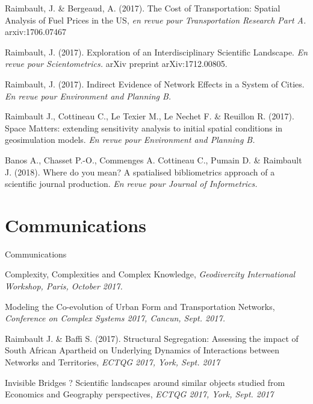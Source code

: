 \noindent Raimbault, J. \& Bergeaud, A. (2017). The Cost of Transportation: Spatial Analysis of Fuel Prices in the US, \textit{en revue pour Transportation Research Part A.} arxiv:1706.07467


\bigskip

\noindent Raimbault, J. (2017). Exploration of an Interdisciplinary Scientific Landscape. \textit{En revue pour Scientometrics.} arXiv preprint arXiv:1712.00805.

\bigskip

\noindent Raimbault, J. (2017). Indirect Evidence of Network Effects in a System of Cities. \textit{En revue pour Environment and Planning B.}

\bigskip

\noindent Raimbault J., Cottineau C., Le Texier M., Le Nechet F. \& Reuillon R.
 (2017). Space Matters: extending sensitivity analysis to initial spatial conditions in geosimulation models. \textit{En revue pour Environment and Planning B.}


\bigskip

\noindent Banos A., Chasset P.-O., Commenges A. Cottineau C., Pumain D. \& Raimbault J. (2018). Where do you mean? A spatialised bibliometrics approach of a scientific journal production. \textit{En revue pour Journal of Informetrics.}





\section*{Communications}{Communications}




\noindent Complexity, Complexities and Complex Knowledge, \textit{Geodivercity International Workshop, Paris, October 2017.}


\bigskip


\noindent Modeling the Co-evolution of Urban Form and Transportation Networks, \textit{Conference on Complex Systems 2017, Cancun, Sept. 2017.}

\bigskip

\noindent Raimbault J. \& Baffi S. (2017). Structural Segregation: Assessing the impact of South African Apartheid on Underlying Dynamics of Interactions between Networks and Territories, \textit{ECTQG 2017, York, Sept. 2017}


\bigskip


\noindent Invisible Bridges ? Scientific landscapes around similar objects studied from Economics and Geography perspectives, \textit{ECTQG 2017, York, Sept. 2017}


